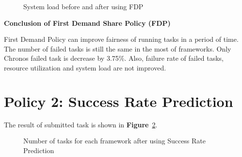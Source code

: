 \documentclass[12pt,oneside,openright,a4paper]{cpe-english-project}
\begin{document}
\begin{enumerate}
\begin{figure}[!h]\centering
    \setlength{\fboxrule}{0mm} %
    \setlength{\fboxsep}{0cm}
    \caption{System load before and after using FDP}\label{fig:load1}
\end{figure}
\end{enumerate}

\textbf{Conclusion of First Demand Share Policy (FDP)}
\newline

\hspace{10mm}First Demand Policy can improve fairness of running tasks in a period of time. The number of failed tasks is still the same in the most of frameworks. Only Chronos failed task is decrease by 3.75\%. Also, failure rate of failed tasks, resource utilization and system load are not improved. 


\section{Policy 2: Success Rate Prediction}  

\hspace{10mm}The result of submitted task is shown in \textbf{Figure}~\ref{fig:task2}.

\begin{figure}[!h]\centering
    \setlength{\fboxrule}{0mm} %
    \setlength{\fboxsep}{0cm}
    \caption{Number of tasks for each framework after using Success Rate Prediction}\label{fig:task2}
\end{figure}
\end{document}
